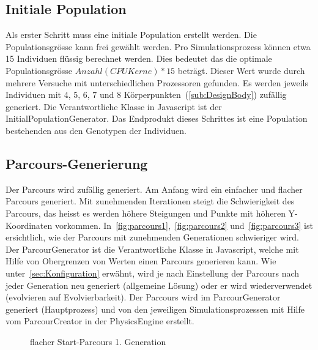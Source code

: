     \subsection{Initiale Population\label{sec:initPop}}

      Als erster Schritt muss eine initiale Population erstellt werden. Die Populationsgrösse kann frei gewählt werden.
      Pro Simulationsprozess können etwa 15 Individuen flüssig berechnet werden.
      Dies bedeutet das die optimale Populationsgrösse  \( Anzahl(CPU Kerne) * 15 \) beträgt.
      Dieser Wert wurde durch mehrere Versuche mit unterschiedlichen Prozessoren gefunden.
      Es werden jeweils Individuen mit 4, 5, 6, 7 und 8 Körperpunkten~(\vref{sub:DesignBody}) zufällig generiert.
      Die Verantwortliche Klasse in Javascript ist der InitialPopulationGenerator.
      Das Endprodukt dieses Schrittes ist eine Population bestehenden aus den Genotypen der Individuen.

    \subsection{Parcours-Generierung\label{sec:ParcourCreation}}

      Der Parcours wird zufällig generiert. Am Anfang wird ein einfacher und flacher Parcours generiert.
      Mit zunehmenden Iterationen steigt die Schwierigkeit des Parcours,
      das heisst es werden höhere Steigungen und Punkte mit höheren Y-Koordinaten vorkommen.
      In~\vref{fig:parcours1},~\vref{fig:parcours2} und~\vref{fig:parcours3} ist ersichtlich,
      wie der Parcours mit zunehmenden Generationen schwieriger wird.
      Der ParcourGenerator ist die Verantwortliche Klasse in Javascript,
      welche mit Hilfe von Obergrenzen von Werten einen Parcours generieren kann.
      Wie unter~\ref{sec:Konfiguration} erwähnt,
      wird je nach Einstellung der Parcours nach jeder Generation neu generiert (allgemeine Lösung) oder
      er wird wiederverwendet (evolvieren auf Evolvierbarkeit).
      Der Parcours wird im ParcourGenerator generiert (Hauptprozess) und
      von den jeweiligen Simulationsprozessen mit Hilfe vom ParcourCreator in der \gls{PhysicsEngine} erstellt.

      \vspace{1cm}

      \begin{figure}[H]
        \centering
        
        \caption{flacher Start-Parcours 1. Generation\label{fig:parcours1}}
      \end{figure}

